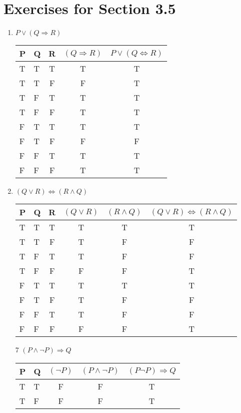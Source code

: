 \documentclass[12pt]{article}
\begin{document}
\section*{Exercises for Section 3.5}
\begin{enumerate}
	\item $P\lor (Q \Rightarrow R)$\\
	    \begin{tabular}{l|l|c|c|c}
		\hline
		P & Q & R & $(Q \Rightarrow R)$ & $P\lor (Q \Leftrightarrow R)$ \\
		\hline
		T & T & T & T & T \\
		T & T & F & F & T \\
		T & F & T & T & T \\
		T & F & F & T & T \\
		F & T & T & T & T \\
		F & T & F & F & F \\
		F & F & T & T & T \\
		F & F & F & T & T \\
		\hline
	    \end{tabular}
	\item $(Q \lor R) \Leftrightarrow (R \land Q)$\\
	    \begin{tabular}{l|l|c|c|c|c}
		\hline
		P & Q & R & $(Q \lor R)$ & $(R \land Q)$ & $(Q \lor R) \Leftrightarrow (R \land Q)$\\
		\hline
		T & T & T & T       & T       & T \\
		T & T & F & T       & F       & F \\
		T & F & T & T       & F       & F \\
		T & F & F & F       & F       & T \\
		F & T & T & T       & T       & T \\
		F & T & F & T       & F       & F \\
		F & F & T & T       & F       & F \\
		F & F & F & F       & F       & T \\
		\hline
	    \end{tabular}
	\item[7] $(P \land \neg P) \Rightarrow Q$\\
	    \begin{tabular}{l|l|c|c|c}
		\hline
		P & Q & $(\neg P)$ & $(P \land \neg P)$ & $(P \neg P) \Rightarrow Q$\\
		\hline
		T & T & F     & F         & T \\
		T & F & F     & F         & T \\

\end{tabular}
\end{enumerate}
\end{document}
